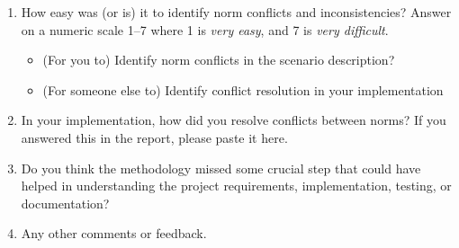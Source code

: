 \begin{enumerate}
\item How easy was (or is) it to identify norm conflicts and inconsistencies? 
Answer on a numeric scale 1--7 where 1 is \emph{very easy}, and 7 is \emph{very difficult}.
\begin{itemize}
\item (For you to) Identify norm conflicts in the scenario description?	
\item (For someone else to) Identify conflict resolution in your implementation	
\end{itemize}

\item In your implementation, how did you resolve conflicts between norms?  If you answered this in the report, please paste it here.

\item Do you think the methodology missed some crucial step that could have helped in understanding the project requirements, implementation, testing, or documentation?

\item Any other comments or feedback.
\end{enumerate}